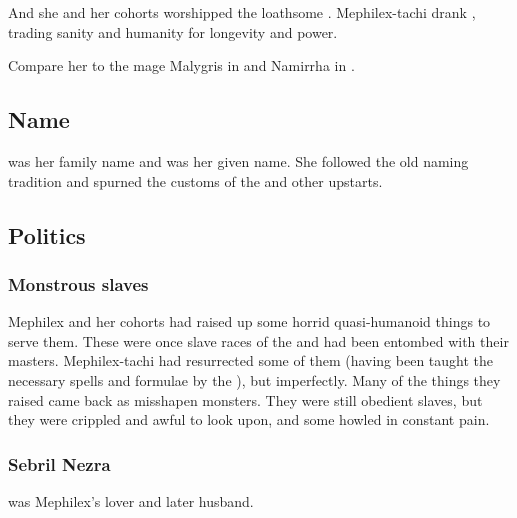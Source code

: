 And she and her cohorts worshipped the loathsome \Ubloth. 
Mephilex-tachi drank , trading sanity and humanity for longevity and power. 

Compare her to the mage Malygris in \cite{ClarkAshtonSmith:TheDeathofMalygris} and Namirrha in \cite{ClarkAshtonSmith:TheDarkEidolon}. 









\subsection{Name}
 was her family name and  was her given name. 
She followed the old \Ortaican naming tradition and spurned the customs of the \Tepharites and other upstarts. 









\subsection{Politics}





\subsubsection{Monstrous slaves}
Mephilex and her cohorts had raised up some horrid quasi-humanoid things to serve them.
These were once slave races of the \ophidians and had been entombed with their masters.
Mephilex-tachi had resurrected some of them (having been taught the necessary spells and formulae by the \ophidians), but imperfectly.
Many of the things they raised came back as misshapen monsters. 
They were still obedient slaves, but they were crippled and awful to look upon, and some howled in constant pain. 





\subsubsection{Sebril Nezra}
 was Mephilex's lover and later husband.





